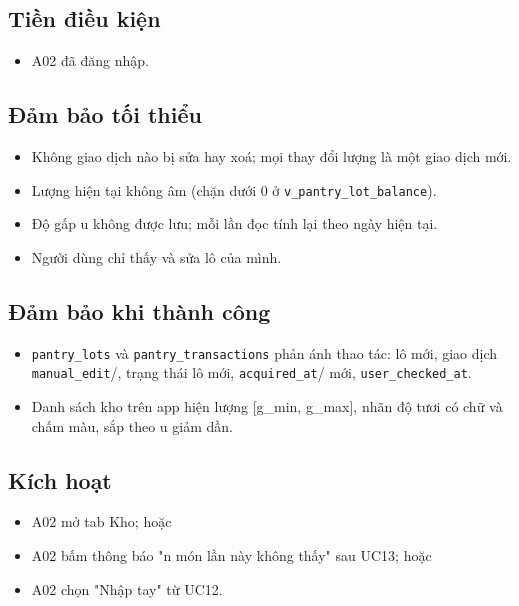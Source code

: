 \subsection{Tiền điều kiện}
\begin{itemize}
\item A02 đã đăng nhập.
\end{itemize}
\subsection{Đảm bảo tối thiểu}
\begin{itemize}
\item Không giao dịch nào bị sửa hay xoá; mọi thay đổi lượng là một giao dịch mới.
\item Lượng hiện tại không âm (chặn dưới 0 ở {\small\texttt{v\_\allowbreak{}\allowbreak{}pantry\_\allowbreak{}\allowbreak{}lot\_\allowbreak{}\allowbreak{}balance}}).
\item Độ gấp u không được lưu; mỗi lần đọc tính lại theo ngày hiện tại.
\item Người dùng chỉ thấy và sửa lô của mình.
\end{itemize}
\subsection{Đảm bảo khi thành công}
\begin{itemize}
\item {\small\texttt{pantry\_\allowbreak{}\allowbreak{}lots}} và {\small\texttt{pantry\_\allowbreak{}\allowbreak{}transactions}} phản ánh thao tác: lô mới, giao dịch {\small\texttt{manual\_\allowbreak{}\allowbreak{}edit}}/, trạng thái lô mới, {\small\texttt{acquired\_\allowbreak{}\allowbreak{}at}}/ mới, {\small\texttt{user\_\allowbreak{}\allowbreak{}checked\_\allowbreak{}\allowbreak{}at}}.
\item Danh sách kho trên app hiện lượng [g\_\allowbreak{}min, g\_\allowbreak{}max], nhãn độ tươi có chữ và chấm màu, sắp theo u giảm dần.
\end{itemize}
\subsection{Kích hoạt}
\begin{itemize}
\item A02 mở tab Kho; hoặc
\item A02 bấm thông báo "n món lần này không thấy" sau UC13; hoặc
\item A02 chọn "Nhập tay" từ UC12.
\end{itemize}

